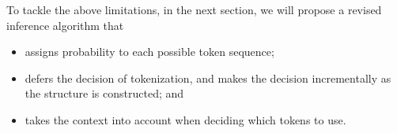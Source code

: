 To tackle the above limitations, in the next section, we will propose
a revised inference algorithm that 
\begin{itemize}
\item assigns probability to each possible token sequence;
\item defers the decision of tokenization, and makes the decision 
      incrementally as the structure is constructed; and
\item takes the context into account when deciding which tokens to use.
\end{itemize}

